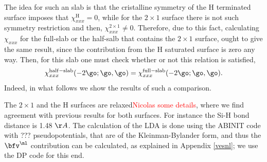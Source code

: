 The idea for such an slab is that the cristalline symmetry of the
H terminated surface imposes that $\chi^{\mathrm{H}}_{xxx}=0$, while
for the $2\times 1$ surface there is not such symmetry restriction and
then, $\chi^{2\times 1}_{xxx}\ne 0$.
Therefore, due to this fact, calculating $\chi_{xxx}$ for the full-slab
or the half-salb that contains the $2\times 1$ surface,
 ought to give the same result, since the contribution from the H
 saturated  surface is zero any way. Then, for this slab one must check
 whether or not this relation is satisfied,
\begin{align}\label{hs}
\chi^{\mathrm{half-slab}}_{xxx}(-2\go;\go,\go)
=
\chi^{\mathrm{full-slab}}_{xxx}(-2\go;\go,\go)
.
\end{align}
Indeed, in what follows we show the results of such a comparison.

The $2\times 1$ and the H surfaces are relaxed\textcolor{red}{Nicolas
  some details}, where we find agreement with previous results for
both surfaces.\cite{relax} For instance the Si-H bond distance is 1.48 $\AA$.
The calculation of the LDA is done using the ABINIT code with ???
pseudopotentials, that are of the Kleinman-Bylander form, and thus the $\bfv^\nl$
contribution can be calculated, as explained in Appendix \ref{vesnl}; 
we use the DP code for this end.\cite{francesco}
